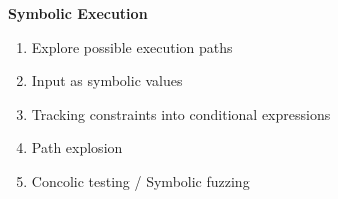 \begin{frame}
	\begin{columns}[t]
		\begin{column}{0.4\textwidth}
			\textbf{Symbolic Execution}
			\small
			\begin{enumerate}
				\item Explore possible execution paths
				\item Input as symbolic values
                \item Tracking constraints into conditional expressions
				\item Path explosion
				\item Concolic testing / Symbolic fuzzing
			\end{enumerate}
		\end{column}
	\end{columns}
\end{frame}
